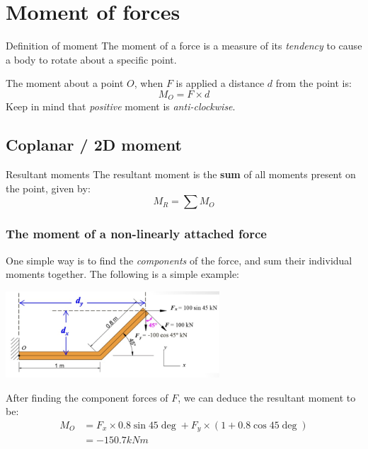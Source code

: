 \documentclass{article}
\begin{document}
\section{Moment of forces}
\begin{definition}
  {Definition of moment}
  The moment of a force is a measure of its \emph{tendency} to cause a body to rotate about a specific point.

  The moment about a point $O$, when $F$ is applied a distance $d$ from the point is:
  \[M_O=F\times d\]
  Keep in mind that \emph{positive} moment is \emph{anti-clockwise}.
\end{definition}
\subsection{Coplanar / 2D moment}
\begin{knBox}
  {Resultant moments}
  The resultant moment is the \textbf{sum} of all moments present on the point, given by:
  \[M_R=\sum M_O\]
\end{knBox}
\subsubsection{The moment of a non-linearly attached force}
One simple way is to find the \emph{components} of the force, and sum their individual moments together. The following is a simple example:
\begin{center}
  \includegraphics[width=8cm]{img/Moment1.jpg}

  After finding the component forces of $F$, we can deduce the resultant moment to be:
  \begin{align*}
    M_O & =F_x\times 0.8\sin 45\deg+F_y\times(1+0.8\cos 45\deg) \\
        & =-150.7kNm
  \end{align*}
\end{center}
\end{document}
